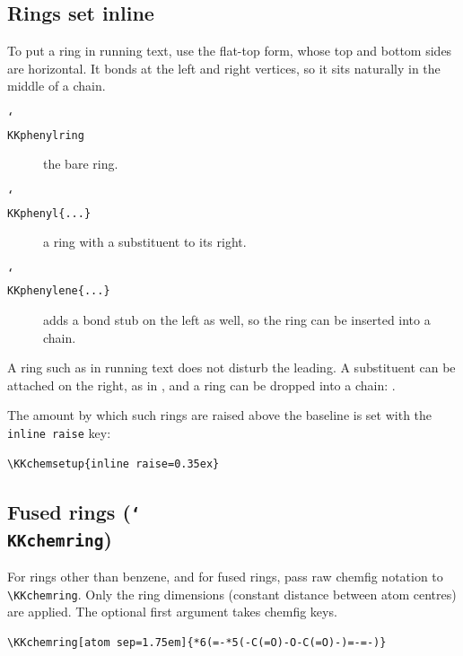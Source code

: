 \documentclass[paper=a4paper,fontsize=10pt]{jlreq}
\begin{document}
\subsection{Rings set inline}

To put a ring in running text, use the flat-top form, whose top and bottom sides
are horizontal. It bonds at the left and right vertices, so it sits naturally in
the middle of a chain.

\begin{description}
\item[\texttt{\char`\\KKphenylring}] the bare ring.
\item[\texttt{\char`\\KKphenyl\{...\}}] a ring with a substituent to its right.
\item[\texttt{\char`\\KKphenylene\{...\}}] adds a bond stub on the left as well,
      so the ring can be inserted into a chain.
\end{description}

A ring such as \KKphenylring{} in running text does not disturb the leading.
A substituent can be attached on the right, as in , and a ring can
be dropped into a chain: .

The amount by which such rings are raised above the baseline is set with the
\verb|inline raise| key:

\begin{verbatim}
\KKchemsetup{inline raise=0.35ex}
\end{verbatim}

\subsection{Fused rings (\texttt{\char`\\KKchemring})}

For rings other than benzene, and for fused rings, pass raw \textsf{chemfig}
notation to \verb|\KKchemring|. Only the ring dimensions (constant distance
between atom centres) are applied. The optional first argument takes
\textsf{chemfig} keys.

\begin{verbatim}
\KKchemring[atom sep=1.75em]{*6(=-*5(-C(=O)-O-C(=O)-)=-=-)}
\end{verbatim}

\begin{center}
\KKphthalicanhydride\qquad\KKmaleicanhydride
\end{center}
\end{document}
